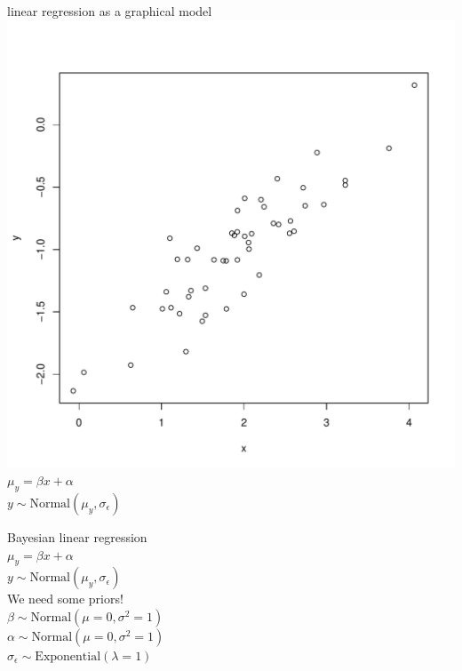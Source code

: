 \documentclass[mathserif]{beamer}
\begin{document}
\begin{frame}
    \small
    \begin{center}
    \alert{linear regression as a graphical model}\\
    \includegraphics[scale=0.4]{figures/linear_regression.pdf}\\
    \smallskip
    $\mu_y = \beta x + \alpha$\\
    $y \sim \text{Normal}(\mu_y, \sigma_{\epsilon})$\\
    \end{center}
\end{frame}


\begin{frame}
    \small
    \begin{center}
    \alert{Bayesian linear regression}\\
    \bigskip
    \bigskip
    $\mu_y = \beta x + \alpha$\\
    $y \sim \text{Normal}(\mu_y, \sigma_{\epsilon})$\\
    \bigskip
    \bigskip
    We need some priors!\\
    \bigskip
    \bigskip
    $\beta \sim \text{Normal}(\mu=0, \sigma^2=1)$\\
    $\alpha \sim \text{Normal}(\mu=0, \sigma^2=1)$\\
    $\sigma_{\epsilon} \sim \text{Exponential}(\lambda=1)$\\
    \end{center}
\end{frame}
\end{document}
